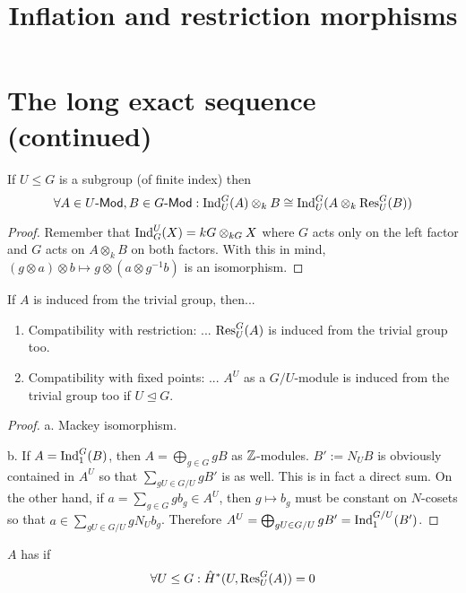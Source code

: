 \documentclass[fontsize=11pt,fleqn,a4paper]{scrartcl}
\title{Inflation and restriction morphisms}
\begin{document}
\maketitle

\setcounter{section}{2}
\section{The long exact sequence (continued)}

\setcounter{theoremnumber}{9}
\begin{proposition}
If $U\leq G$ is a subgroup (of finite index) then
\[\forall A\in U\textsf{-Mod}, B\in G\textsf{-Mod}: \operatorname{Ind}_U^G(A) \otimes_k B \cong \operatorname{Ind}_U^G(A\otimes_k \operatorname{Res}_U^G(B))\]
\end{proposition}
\begin{proof}
Remember that $\operatorname{Ind}_G^U(X) = kG \otimes_{kG} X$ where $G$ acts only on the left factor and $G$ acts on $A \otimes_k B$ on both factors. With this in mind, 
$(g\otimes a)\otimes b \mapsto g\otimes(a\otimes g^{-1} b)$ is an isomorphism.
\end{proof}

\begin{proposition}
If $A$ is induced from the trivial group, then...
\begin{enumerate}
\item Compatibility with restriction: ... $\operatorname{Res}_U^G(A)$ is induced from the trivial group too.
\item Compatibility with fixed points: ... $A^U$ as a $G/U$-module is induced from the trivial group too if $U\unlhd G$.
\end{enumerate}
\end{proposition}
\begin{proof}
a. Mackey isomorphism.

b. If $A=\operatorname{Ind}_1^G(B)$, then $A = \bigoplus_{g\in G} gB$ as $\mathbb{Z}$-modules. $B':=N_U B$ is obviously contained in $A^U$ so that $\sum_{gU\in G/U} gB'$ is as well. This is in fact a direct sum. On the other hand, if $a=\sum_{g\in G} gb_g \in A^U$, then $g\mapsto b_g$ must be constant on $N$-cosets so that $a\in \sum_{gU\in G/U} gN_U b_g$. Therefore $A^U = \bigoplus_{gU\in G/U} g B' = \operatorname{Ind}_1^{G/U}(B')$.
\end{proof}

\begin{definition}
$A$ has  if
\[\forall U\leq G: \hat{H}^\ast(U,\operatorname{Res}_U^G(A)) = 0\]
\end{definition}
\end{document}
